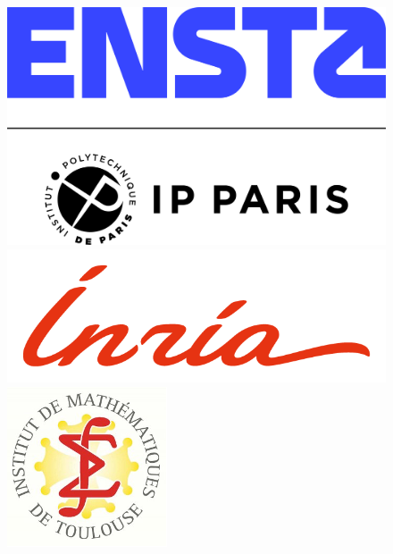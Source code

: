 \documentclass[twoside, 12pt]{article}
\author{Luana DE QUEIROZ GARCIA}
\date{May 2024}
\makeatletter
\renewenvironment{titlepage}
 {%
  \if@twocolumn
    \@restonecoltrue\onecolumn
  \else
    \@restonecolfalse\newpage
  \fi
  \thispagestyle{plain}%
 }
 {%
  \if@restonecol
    \twocolumn
  \else
    \newpage
  \fi
 }
\makeatother
\begin{document}

\begin{titlepage}
    \thispagestyle{empty}

    \begin{figure}[h]
    \centering
    \begin{minipage}[b]{0.3\textwidth}
        \raggedright
        \includegraphics[height=0.45\textwidth]{Images/logos/logo_ensta.png}
    \end{minipage}
    \hfill
    \begin{minipage}[b]{0.3\textwidth}
        \raggedleft
        \includegraphics[height=0.4\textwidth]{Images/logos/inr_logo_rouge.png}
    \end{minipage}
    \hfill
    \begin{minipage}[b]{0.3\textwidth}
        \raggedleft
        \includegraphics[height=0.5\textwidth]{Images/logos/logo-IMT.png}
    \end{minipage}
    \end{figure}
    

\end{titlepage}
\end{document}
